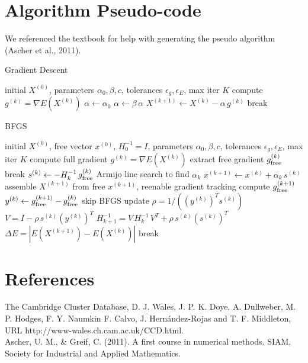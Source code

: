 \documentclass[11pt,onecolumn]{article}
\begin{document}
\section{Algorithm Pseudo-code}
We referenced the textbook for help with generating the pseudo algorithm (Ascher et al., 2011).
\begin{algorithm}[H]
\caption{Gradient Descent}
\begin{algorithmic}[1]
\Require initial $X^{(0)}$, parameters $\alpha_0, \beta, c$, tolerances $\epsilon_g, \epsilon_E$, max iter $K$
  \State compute $g^{(k)} = \nabla E(X^{(k)})$
  \State $\alpha \gets \alpha_0$
    \State $\alpha \gets \beta\,\alpha$
  \EndWhile
  \State $X^{(k+1)} \gets X^{(k)} - \alpha\,g^{(k)}$
    \State break 
  \EndIf
\EndFor
\end{algorithmic}
\end{algorithm}
\begin{algorithm}[H]
\caption{BFGS}
\begin{algorithmic}[1]
\Require initial $X^{(0)}$, free vector $x^{(0)}$, $H_0^{-1}=I$, parameters $\alpha_0, \beta, c$, tolerances $\epsilon_g, \epsilon_E$, max iter $K$
  \State compute full gradient $g^{(k)} = \nabla E(X^{(k)})$
  \State extract free gradient $g^{(k)}_{\rm free}$
    \State break 
  \EndIf
  \State $s^{(k)} \gets -H_k^{-1}\,g^{(k)}_{\rm free}$
  \State Armijo line search to find $\alpha_k$
  \State $x^{(k+1)} \gets x^{(k)} + \alpha_k\,s^{(k)}$
  \State assemble $X^{(k+1)}$ from free $x^{(k+1)}$, reenable gradient tracking
  \State compute $g^{(k+1)}_{\rm free}$
  \State $y^{(k)} \gets g^{(k+1)}_{\rm free} - g^{(k)}_{\rm free}$
    \State skip BFGS update
  \Else
    \State $\rho = 1 / ((y^{(k)})^T s^{(k)})$
    \State $V = I - \rho\,s^{(k)}(y^{(k)})^T$
    \State $H_{k+1}^{-1} = V\,H_k^{-1}\,V^T + \rho\,s^{(k)}(s^{(k)})^T$
  \EndIf
  \State $\Delta E = |E(X^{(k+1)}) - E(X^{(k)})|$
    \State break 
  \EndIf
\EndFor
\end{algorithmic}
\end{algorithm}

\newpage
\section{References}
The Cambridge Cluster Database, D. J. Wales, J. P. K. Doye, A. Dullweber, M. P. Hodges, F. Y. Naumkin F. Calvo, J. Hernández-Rojas and T. F. Middleton, URL http://www-wales.ch.cam.ac.uk/CCD.html.\\

Ascher, U. M., \& Greif, C. (2011). A first course in numerical methods. SIAM, Society for Industrial and Applied Mathematics. 
\end{document}
